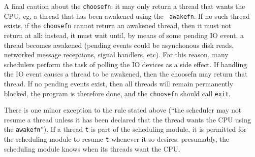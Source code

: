 A final caution about the {\tt choosefn}: it may only return a thread
that wants the CPU, eg, a thread that has been awakened using the {\tt
awakefn}.  If no such thread exists, if the {\tt choosefn} cannot
return an awakened thread, then it must not return at all: instead, it
must wait until, by means of some pending IO event, a thread becomes
awakened (pending events could be asynchonous disk reads, networked
message receptions, signal handlers, etc).  For this reason, many
schedulers perform the task of polling the IO devices as a side
effect.  If handling the IO event causes a thread to be awakened, then
the choosefn may return that thread.  If no pending events exist, then
all threads will remain permanently blocked, the program is therefore
done, and the {\tt choosefn} should call {\tt exit}.

There is one minor exception to the rule stated above (``the scheduler
may not resume a thread unless it has been declared that the thread
wants the CPU using the {\tt awakefn}'').  If a thread {\tt t} is part
of the scheduling module, it is permitted for the scheduling module to
resume {\tt t} whenever it so desires: presumably, the scheduling
module knows when its threads want the CPU.

